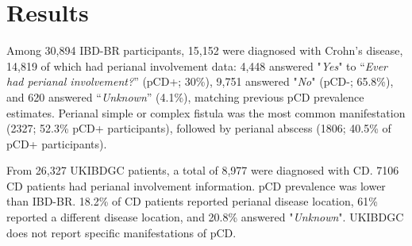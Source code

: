 


\section{Results}
Among 30,894 IBD-BR participants, 15,152 were diagnosed with Crohn's disease, 14,819 of which had perianal involvement data: 4,448 answered "\textit{Yes}" to “\textit{Ever had perianal involvement?}” (pCD+; 30\%), 9,751 answered "\textit{No}" (pCD-; 65.8\%), and 620 answered “\textit{Unknown}” (4.1\%), matching previous pCD prevalence estimates. Perianal simple or complex fistula was the most common manifestation (2327;  52.3\% pCD+ participants), followed by perianal abscess (1806; 40.5\% of pCD+ participants).

From 26,327 UKIBDGC patients, a total of 8,977 were diagnosed with CD. 7106 CD patients had perianal involvement information. pCD prevalence was lower than IBD-BR. 18.2\% of CD patients reported perianal disease location, 61\% reported a different disease location, and 20.8\% answered "\textit{Unknown}". UKIBDGC does not report specific manifestations of pCD.


